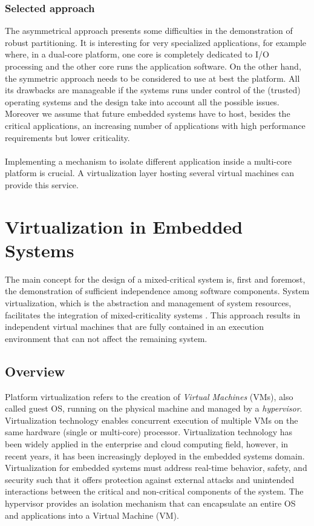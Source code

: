 \subsubsection{Selected approach}
The asymmetrical approach presents some difficulties in the demonstration of robust partitioning. It is interesting for very specialized applications, for example where, in a dual-core platform, one core is completely dedicated to I/O processing and the other core runs the application software. On the other hand, the symmetric approach needs to be considered to use at best the platform. All its drawbacks  are manageable if the systems runs under control of the (trusted) operating systems and the design take into account all the possible issues. Moreover we assume that future embedded systems have to host, besides the critical applications, an increasing number of applications with high performance requirements but lower criticality.

\paragraph{} Implementing a mechanism to isolate different application inside a multi-core platform is crucial. A virtualization layer hosting several virtual machines can provide this service.

\section{Virtualization in Embedded Systems}
The main concept for the design of a mixed-critical system is, first and foremost, the demonstration of sufficient independence among software components. System virtualization, which is the abstraction and management of system resources, facilitates the integration of mixed-criticality systems \cite{multipartes}. This approach results in independent virtual machines that are fully contained in an execution environment that can not affect the remaining system. 

\subsection{Overview}
Platform virtualization refers to the creation of \emph{Virtual Machines} (VMs), also called guest OS, running on the physical machine and managed by a \emph{hypervisor}. Virtualization technology enables concurrent execution of multiple VMs on the same hardware (single or multi-core) processor. Virtualization technology has been widely applied in the enterprise and cloud computing field, however, in recent years, it has been increasingly deployed in the embedded systems domain. Virtualization for embedded systems must address real-time behavior, safety, and security such that it offers protection against external attacks and unintended
interactions between the critical and non-critical components of the system. The hypervisor provides an isolation mechanism that can encapsulate an entire OS and applications into a Virtual Machine (VM).

